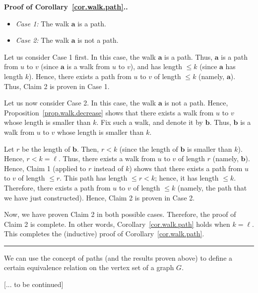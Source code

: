 \documentclass[numbers=enddot,12pt,final,onecolumn,notitlepage]{scrartcl}%
\theoremstyle{definition}
\newenvironment{proof}[1][Proof]{\noindent\textbf{#1.} }{\ \rule{0.5em}{0.5em}}
\begin{document}
\begin{proof}[Proof of Corollary~\ref{cor.walk.path}.]
\begin{itemize}
\item \textit{Case 1:} The walk $\mathbf{a}$ is a path.
\item \textit{Case 2:} The walk $\mathbf{a}$ is not a path.
\end{itemize}

Let us consider Case 1 first. In this case, the walk $\mathbf{a}$ is a
path. Thus, $\mathbf{a}$ is a path from $u$ to $v$ (since $\mathbf{a}$
is a walk from $u$ to $v$), and has length $\leq k$ (since
$\mathbf{a}$ has length $k$). Hence, there exists a path from $u$ to
$v$ of length $\leq k$ (namely, $\mathbf{a}$). Thus, Claim 2 is proven
in Case 1.

Let us now consider Case 2. In this case, the walk $\mathbf{a}$ is not
a path. Hence, Proposition~\ref{prop.walk.decrease} shows that there
exists a walk from $u$ to $v$ whose length is smaller than $k$.
Fix such a walk, and denote it by $\mathbf{b}$. Thus, $\mathbf{b}$ is
a walk from $u$ to $v$ whose length is smaller than $k$.

Let $r$ be the length of $\mathbf{b}$. Then, $r < k$ (since the length
of $\mathbf{b}$ is smaller than $k$). Hence, $r < k = \ell$. Thus,
there exists a walk from $u$ to $v$ of length $r$ (namely,
$\mathbf{b}$). Hence, Claim 1 (applied to $r$ instead of $k$) shows
that there exists a path from $u$ to $v$ of length $\leq r$.
This path has length $\leq r < k$; hence, it has length $\leq k$.
Therefore, there exists a path from $u$ to $v$ of length $\leq k$
(namely, the path that we have just constructed). Hence, Claim 2 is
proven in Case 2.

Now, we have proven Claim 2 in both possible cases. Therefore, the
proof of Claim 2 is complete. In other words,
Corollary~\ref{cor.walk.path} holds when $k = \ell$. This completes
the (inductive) proof of Corollary~\ref{cor.walk.path}.
\end{proof}

We can use the concept of paths (and the results proven above) to
define a certain equivalence relation on the vertex set of a graph
$G$.

[... to be continued]
\end{document}
